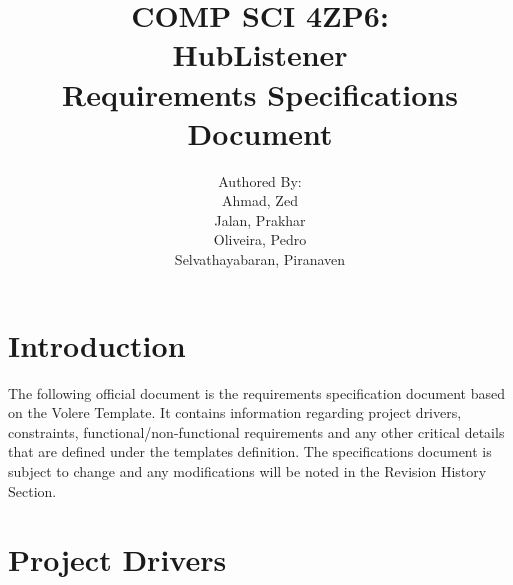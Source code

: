 \documentclass{article}
\title{COMP SCI 4ZP6:\\ \textbf{HubListener}\\ Requirements Specifications Document}
\author{ Authored By:
\\ Ahmad, Zed
\\ Jalan, Prakhar 
\\ Oliveira, Pedro
\\ Selvathayabaran, Piranaven
}
\date{}
\begin{document}
\newpage

\maketitle

\newpage
\tableofcontents {}
\newpage

\section{Introduction}

The following official document is the requirements specification document based on the Volere Template. It contains information regarding project drivers, constraints, functional/non-functional requirements and any other critical details that are defined under the templates definition. The specifications document is subject to change and any modifications will be noted in the Revision History Section. 
\newpage
\section{Project Drivers}
\end{document}
